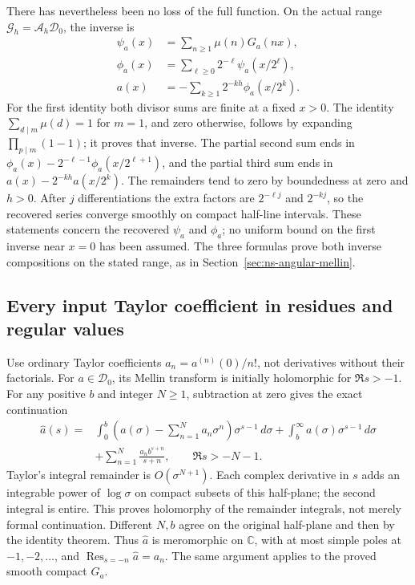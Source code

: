 There has nevertheless been no loss of the full function. On the
actual range \(\mathcal G_h=\mathcal A_h\mathcal D_0\), the inverse is
\begin{equation}\label{ndm:inverse}
 \begin{split}
 \psi_a(x)&=\sum_{n\ge1}\mu(n)G_a(nx),\\
 \phi_a(x)&=\sum_{\ell\ge0}2^{-\ell}\psi_a(x/2^\ell),\\
 a(x)&=-\sum_{k\ge1}2^{-kh}\phi_a(x/2^k).
 \end{split}
\end{equation}
For the first identity both divisor sums are finite at a fixed
\(x>0\). The identity
\(\sum_{d\mid m}\mu(d)=1\) for \(m=1\), and zero otherwise,
follows by expanding \(\prod_{p\mid m}(1-1)\); it proves that inverse.
The partial second sum ends in
\(\phi_a(x)-2^{-\ell-1}\phi_a(x/2^{\ell+1})\), and the partial
third sum ends in \(a(x)-2^{-kh}a(x/2^k)\).
The remainders tend to zero by boundedness at zero and \(h>0\).
After \(j\) differentiations the extra factors are \(2^{-\ell j}\)
and \(2^{-kj}\), so the recovered series converge smoothly on compact
half-line intervals. These statements concern the recovered \(\psi_a\)
and \(\phi_a\); no uniform bound on the first inverse near \(x=0\)
has been assumed. The three formulas prove both inverse compositions
on the stated range, as in Section~\ref{sec:ns-angular-mellin}.

\subsection{Every input Taylor coefficient in residues and regular values}

Use ordinary Taylor coefficients \(a_n=a^{(n)}(0)/n!\), not derivatives
without their factorials. For \(a\in\mathcal D_0\), its Mellin
transform is initially holomorphic for \(\Re s>-1\).
For any positive \(b\) and integer \(N\ge1\), subtraction at zero gives
the exact continuation
\begin{equation}\label{ndm:continuation}
 \begin{split}
 \widehat a(s)={}&
 \int_0^b\left(a(\sigma)-\sum_{n=1}^Na_n\sigma^n\right)
                       \sigma^{s-1}\,d\sigma
 +\int_b^\infty a(\sigma)\sigma^{s-1}\,d\sigma\\
 &+\sum_{n=1}^N\frac{a_n b^{s+n}}{s+n},\qquad \Re s>-N-1 .
 \end{split}
\end{equation}
Taylor's integral remainder is \(O(\sigma^{N+1})\). Each complex
derivative in \(s\) adds an integrable power of \(\log\sigma\) on
compact subsets of this half-plane; the second integral is entire.
This proves holomorphy of the remainder integrals, not merely formal
continuation. Different \(N,b\) agree on the original half-plane
and then by the identity theorem. Thus \(\widehat a\) is meromorphic
on \(\mathbb C\), with at most simple poles at \(-1,-2,\ldots\), and
\(\operatorname{Res}_{s=-n}\widehat a=a_n\).
The same argument applies to the proved smooth compact \(G_a\).

